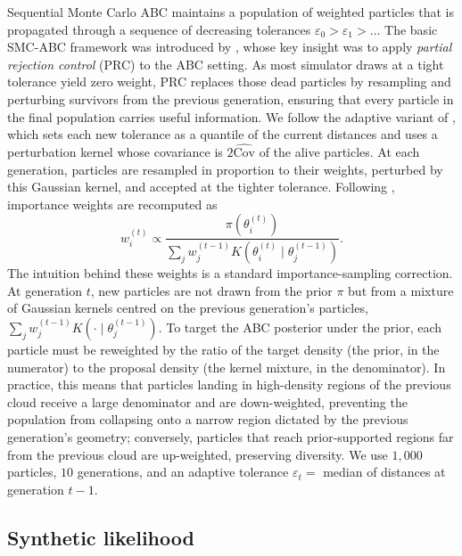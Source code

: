 \documentclass[11pt]{article}
\begin{document}
Sequential Monte Carlo ABC \citep{sisson2007sequential, beaumont2009adaptive} maintains a population of weighted particles that is propagated through a sequence of decreasing tolerances $\varepsilon_0 > \varepsilon_1 > \dots$ The basic SMC-ABC framework was introduced by \citet{sisson2007sequential}, whose key insight was to apply \emph{partial rejection control} (PRC) to the ABC setting. As most simulator draws at a tight tolerance yield zero weight, PRC replaces those dead particles by resampling and perturbing survivors from the previous generation, ensuring that every particle in the final population carries useful information. We follow the adaptive variant of \citet{beaumont2009adaptive}, which sets each new tolerance as a quantile of the current distances and uses a perturbation kernel whose covariance is $2\widehat{\text{Cov}}$ of the alive particles. At each generation, particles are resampled in proportion to their weights, perturbed by this Gaussian kernel, and accepted at the tighter tolerance. Following \citet{beaumont2009adaptive}, importance weights are recomputed as
\begin{equation}
w_i^{(t)} \propto \frac{\pi(\theta_i^{(t)})}{\sum_j w_j^{(t-1)} K(\theta_i^{(t)} \mid \theta_j^{(t-1)})}.
\end{equation}
The intuition behind these weights is a standard importance-sampling correction. At generation $t$, new particles are not drawn from the prior $\pi$ but from a mixture of Gaussian kernels centred on the previous generation's particles, $\sum_j w_j^{(t-1)} K(\cdot \mid \theta_j^{(t-1)})$. To target the ABC posterior under the prior, each particle must be reweighted by the ratio of the target density (the prior, in the numerator) to the proposal density (the kernel mixture, in the denominator). In practice, this means that particles landing in high-density regions of the previous cloud receive a large denominator and are down-weighted, preventing the population from collapsing onto a narrow region dictated by the previous generation's geometry; conversely, particles that reach prior-supported regions far from the previous cloud are up-weighted, preserving diversity. We use $1{,}000$ particles, $10$ generations, and an adaptive tolerance $\varepsilon_t = $ median of distances at generation $t-1$.

\subsection{Synthetic likelihood}
\end{document}
